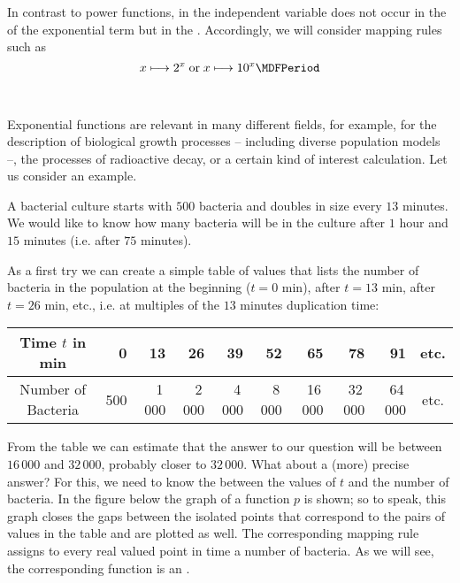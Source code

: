 \begin{MIntro}

In contrast to power functions, in  the independent variable 
does not occur in the  of the exponential term but in the .
Accordingly, we will consider mapping rules such as
$$x \longmapsto 2^x\; \text{or}\; x \longmapsto 10^x \MDFPeriod$$
\ \\ \ \\
Exponential functions are relevant in many different fields, for example, for the description of 
biological growth processes -- including diverse population models --, the processes of radioactive decay, or 
a certain kind of interest calculation. Let us consider an example.

\begin{MExample}

A bacterial culture starts with $500$ bacteria and doubles in size every $13$ minutes. We would like to know how many
bacteria will be in the culture after $1$ hour and $15$ minutes (i.e. after $75$ minutes).

As a first try we can create a simple table of values that lists the number of bacteria in the population at 
the beginning ($t=0$ min), after $t = 13$ min, after $t = 26$ min, etc., i.e. at multiples of the 
$13$ minutes duplication time:
\begin{center}
 \begin{tabular}{|c|r|r|r|r|r|r|r|r|c|}
 \hline
 Time $t$ in min & 0 & 13 & 26 & 39 & 52 & 65 & 78 & 91 & etc. \\ \hline
 Number of Bacteria & 500 & 1\,000 & 2\,000 & 4\,000 & 8\,000 & 16\,000 & 32\,000 & 64\,000 & etc. \\ 
 \hline
 \end{tabular}
\end{center}
From the table we can estimate that the answer to our question will be between $16\,000$ and $32\,000$, probably 
closer to $32\,000$. What about a (more) precise answer? For this, we need to know the 
 between the values of $t$ and the number of bacteria. In the figure below 
the graph of a function $p$ is shown; so to speak, this graph closes the gaps between the isolated points that 
correspond to the pairs of values in the table and are plotted as well. The corresponding mapping rule 
assigns to every real valued point in time a number of bacteria. As we will see, the corresponding function 
is an .


\end{MExample}
\end{MIntro}
